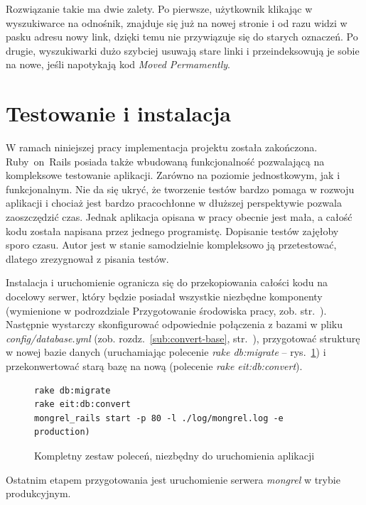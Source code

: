 \documentclass[a4paper,12pt,oneside]{report}
\begin{document}
Rozwiązanie takie ma dwie zalety. Po pierwsze, użytkownik klikając w wyszukiwarce na odnośnik, znajduje się już na nowej stronie i od razu widzi w pasku adresu nowy link, dzięki temu nie przywiązuje się do starych oznaczeń. Po drugie, wyszukiwarki dużo szybciej usuwają stare linki i przeindeksowują je sobie na nowe, jeśli napotykają kod \emph{Moved Permamently}.

\section{Testowanie i instalacja}
\label{sec:testowanie}
W ramach niniejszej pracy implementacja projektu została zakończona. Ruby~on~Rails posiada także wbudowaną funkcjonalność pozwalającą na kompleksowe testowanie aplikacji. Zarówno na poziomie jednostkowym, jak i funkcjonalnym. Nie da się ukryć, że tworzenie testów bardzo pomaga w rozwoju aplikacji i chociaż jest bardzo pracochłonne w dłuższej perspektywie pozwala zaoszczędzić czas. Jednak aplikacja opisana w pracy obecnie jest mała, a całość kodu została napisana przez jednego programistę. Dopisanie testów zajęłoby sporo czasu. Autor jest w stanie samodzielnie kompleksowo ją przetestować, dlatego zrezygnował z pisania testów.

Instalacja i uruchomienie ogranicza się do przekopiowania całości kodu na docelowy serwer, który będzie posiadał wszystkie niezbędne komponenty (wymienione w podrozdziale Przygotowanie środowiska pracy, zob. str.~\pageref{sec:srodowisko}). Następnie wystarczy skonfigurować odpowiednie połączenia z bazami w pliku \emph{config/database.yml} (zob. rozdz.~\ref{sub:convert-base}, str.~\pageref{sub:convert-base}), przygotować strukturę w nowej bazie danych (uruchamiając polecenie \emph{rake db:migrate} -- rys.~\ref{fig:runapp}) i przekonwertować starą bazę na nową (polecenie \emph{rake eit:db:convert}).
\begin{figure}[h]
\centering
\begin{verbatim}rake db:migrate
rake eit:db:convert
mongrel_rails start -p 80 -l ./log/mongrel.log -e production)\end{verbatim}
\caption{Kompletny zestaw poleceń, niezbędny do uruchomienia aplikacji\label{fig:runapp}}
\end{figure}

Ostatnim etapem przygotowania jest uruchomienie serwera \emph{mongrel} w trybie produkcyjnym.

\end{document}

